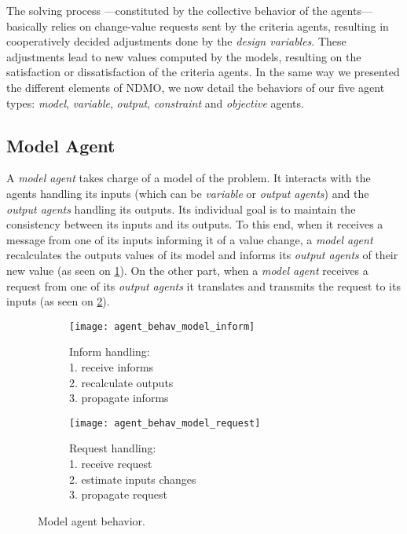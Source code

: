 The solving process ---constituted by the collective behavior of the agents--- basically relies on change-value requests sent by the criteria agents, resulting in cooperatively decided adjustments done by the \emph{design variables}. These adjustments lead to new values computed by the models, resulting on the satisfaction or dissatisfaction of the criteria agents. 
In the same way we presented the different elements of NDMO, we now detail the behaviors of our five agent types: \emph{model}, \emph{variable}, \emph{output}, \emph{constraint} and \emph{objective} agents.

\subsection{Model Agent}

A \emph{model agent} takes charge of a model of the problem. It interacts with the agents handling its inputs (which can be \emph{variable} or \emph{output agents}) and the \emph{output agents} handling its outputs. Its individual goal is to maintain the consistency between its inputs and its outputs. To this end, when it receives a message from one of its inputs informing it of a value change, a \emph{model agent} recalculates the outputs values of its model and informs its \emph{output agents} of their new value (as seen on \figurename{} \ref{agent_behav_model:inf}). On the other part, when a \emph{model agent} receives a request from one of its \emph{output agents} it translates and transmits the request to its inputs (as seen on \figurename{} \ref{agent_behav_model:req}). 

\begin{figure}
\centering
\begin{subfigure}{0.35\textwidth}
		\centering
		\texttt{[image: agent\_behav\_model\_inform]}
		\caption{Inform handling:\\1. receive informs\\2. recalculate outputs\\3. propagate informs}\label{agent_behav_model:inf}
\end{subfigure}
\qquad
\begin{subfigure}{0.35\textwidth}
		\centering
		\texttt{[image: agent\_behav\_model\_request]}
		\caption{Request handling:\\1. receive request\\2. estimate inputs changes\\3. propagate request}\label{agent_behav_model:req}
\end{subfigure}
\caption{Model agent behavior.}\label{agent_behav_model}
\end{figure}

